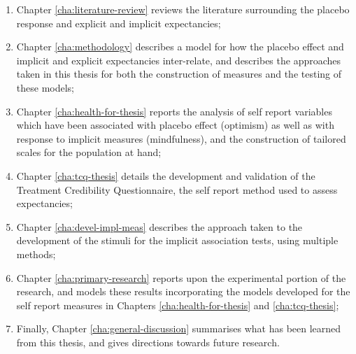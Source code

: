 \begin{enumerate}
\item Chapter \ref{cha:literature-review} reviews the literature surrounding the placebo response and explicit and implicit expectancies;

\item Chapter \ref{cha:methodology} describes a model for how the placebo effect and implicit and explicit expectancies inter-relate, and describes the approaches taken in this thesis for both the construction of measures and the testing of these models;


\item Chapter \ref{cha:health-for-thesis} reports the analysis of self report variables which have been associated with placebo effect (optimism) as well as with response to implicit measures (mindfulness), and the construction of tailored scales for the population at hand;

\item Chapter \ref{cha:tcq-thesis} details the development and validation of the Treatment Credibility Questionnaire, the self report method used to assess expectancies;

\item Chapter \ref{cha:devel-impl-meas} describes the approach taken to the development of the stimuli for the implicit association tests, using multiple methods;

\item Chapter \ref{cha:primary-research} reports upon the experimental portion of the research, and models these results incorporating the models developed for the self report measures in Chapters \ref{cha:health-for-thesis} and \ref{cha:tcq-thesis};

\item Finally, Chapter \ref{cha:general-discussion} summarises what has been learned from this thesis, and gives directions towards future research.

\end{enumerate}




